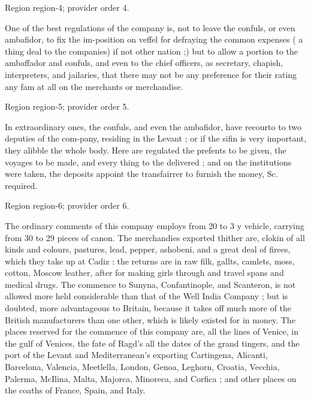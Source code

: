 \documentclass[11pt]{article}
\begin{document}
{\scriptsize\color{gray} Region region-4; provider order 4.\par}
\medskip

One of the best regulations of the company is, not to leave the confuls, or even ambafidor, to fix the im-position on veffel for defraying the common expenses ( a thing deal to the companies) if not other nation ;) but to allow a portion to the ambaffador and confuls, and even to the chief officers, as secretary, chapish, interpreters, and jailaries, that there may not be any preference for their rating any fam at all on the merchants or merchandise.
\par

{\scriptsize\color{gray} Region region-5; provider order 5.\par}
\medskip

In extraordinary ones, the confuls, and even the ambafidor, have recourto to two deputies of the com-pany, residing in the Levant ; or if the sifin is very important, they alibble the whole body. Here are regulated the prefents to be given, the voyages to be made, and every thing to the delivered ; and on the institutions were taken, the deposits appoint the transfairrer to furnish the money, Sc. required.
\par

{\scriptsize\color{gray} Region region-6; provider order 6.\par}
\medskip

The ordinary comments of this company employs from 20 to 3 y vehicle, carrying from 30 to 29 pieces of canon. The merchandies exported thither are, clokin of all kinds and colours, pastures, lead, pepper, ashobeni, and a great deal of firees, which they take up at Cadiz : the returns are in raw filk, gallts, camlets, moss, cotton, Moscow leather, after for making girls through and travel spans and medical drugs. The commence to Sunyna, Confantinople, and Scanteron, is not allowed more held considerable than that of the Well India Company ; but is doubted, more advantageous to Britain, because it takes off much more of the British manufacturers than one other, which is likely existed for in money. The places reserved for the commence of this company are, all the lines of Venice, in the gulf of Venices, the fate of Ragd's all the dates of the grand tingers, and the port of the Levant and Mediterranean's exporting Cartingena, Alicanti, Barcelona, Valencia, Meetlella, London, Genoa, Leghorn, Croatia, Vecchia, Palerma, McIlina, Malta, Majorca, Minoreca, and Corfica ; and other places on the coaths of France, Spain, and Italy.
\par
\end{document}
